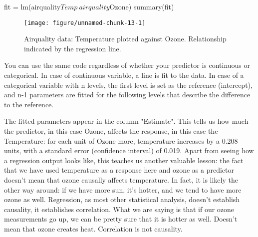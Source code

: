 \documentclass[a4paper,twoside]{tufte-book}\usepackage[]{graphicx}\usepackage[]{color}
\makeatletter
\def\maxwidth{ %
  \ifdim\Gin@nat@width>\linewidth
    \linewidth
  \else
    \Gin@nat@width
  \fi
}
\makeatother
\begin{document}
\begin{Schunk}
\begin{Sinput}
fit = lm(airquality$Temp~airquality$Ozone)
summary(fit)
\end{Sinput}
\end{Schunk}

\begin{figure}[htbp]
\begin{center}
\begin{Schunk}

\texttt{[image: figure/unnamed-chunk-13-1]} \end{Schunk}
\caption{Airquality data: Temperature plotted against Ozone. Relationship indicated by the regression line.}
\label{fig: LR}
\end{center}
\end{figure}

You can use the same code regardless of whether your predictor is continuous or categorical. In case of continuous variable, a line is fit to the data. In case of a categorical variable with n levels, the first level is set as the reference (intercept), and n-1 parameters are fitted for the following levels that describe the difference to the reference. 

The fitted parameters appear in the column "Estimate". This tells us how much the predictor, in this case Ozone, affects the response, in this case the Temperature: for each unit of Ozone more, temperature increases by a 0.208 units, with a standard error (confidence interval) of 0.019. Apart from seeing how a regression output looks like, this teaches us another valuable lesson: the fact that we have used temperature as a response here and ozone as a predictor doesn't mean that ozone causally affects temperature.  In fact, it is likely the other way around: if we have more sun, it's hotter, and we tend to have more ozone as well. Regression, as most other statistical analysis, doesn't establish causality, it establishes correlation. What we are saying is that if our ozone measurements go up, we can be pretty sure that it is hotter as well. Doesn't mean that ozone creates heat. Correlation is not causality. 
\end{document}
